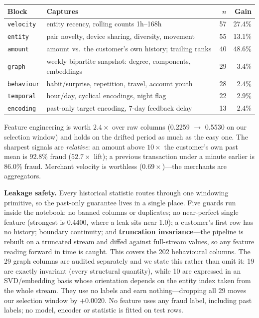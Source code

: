 \documentclass[10pt,a4paper]{article}
\begin{document}
\begin{center}\small
\begin{tabular}{@{}llrr@{}}
\toprule
Block & Captures & $n$ & Gain \\
\midrule
\texttt{velocity}  & entity recency, rolling counts 1h--168h & 57 & 27.4\% \\
\texttt{entity}    & pair novelty, device sharing, diversity, movement & 55 & 13.1\% \\
\texttt{amount}    & amount vs.\ the customer's own history; trailing ranks & 40 & 48.6\% \\
\texttt{graph}     & weekly bipartite snapshot: degree, components, embeddings & 29 & 3.4\% \\
\texttt{behaviour} & habit/surprise, repetition, travel, account youth & 28 & 2.4\% \\
\texttt{temporal}  & hour/day, cyclical encodings, night flag & 22 & 2.9\% \\
\texttt{encoding}  & past-only target encoding, 7-day feedback delay & 13 & 2.4\% \\
\bottomrule
\end{tabular}
\end{center}

\vspace{-3pt}
Feature engineering is worth $2.4\times$ over raw columns (0.2259 $\rightarrow$
0.5530 on our selection window) and holds on the drifted period as much as the
easy one. The sharpest signals are \emph{relative}: an amount above $10\times$
the customer's own past mean is 92.8\% fraud ($52.7\times$ lift); a previous
transaction under a minute earlier is 86.0\% fraud. Merchant velocity is
worthless ($0.69\times$)---the merchants are aggregators.

\textbf{Leakage safety.} Every historical statistic routes through one windowing
primitive, so the past-only guarantee lives in a single place. Five guards run
inside the notebook: no banned columns or duplicates; no near-perfect single
feature (strongest is 0.4400, where a leak sits near 1.0); a customer's first row
has no history; boundary continuity; and \textbf{truncation invariance}---the
pipeline is rebuilt on a truncated stream and diffed against full-stream values,
so any feature reading forward in time is caught. This covers the 202 behavioural
columns. The 29 graph columns are audited separately and we state this rather
than omit it: 19 are exactly invariant (every structural quantity), while 10 are
expressed in an SVD/embedding basis whose orientation depends on the entity index
taken from the whole stream. They use no labels and earn nothing---dropping all
29 moves our selection window by $+0.0020$. No feature uses any fraud label,
including past labels; no model, encoder or statistic is fitted on test rows.
\end{document}
